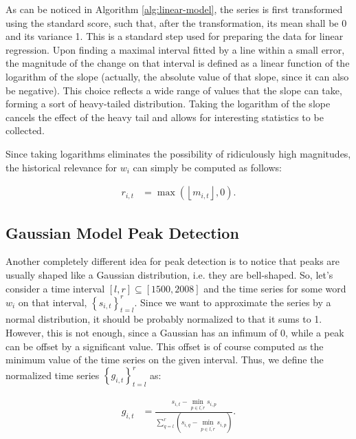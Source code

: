 As can be noticed in Algorithm \autoref{alg:linear-model}, the series is first transformed using the standard score, such that, after the transformation, its mean shall be 0 and its variance 1. This is a standard step used for preparing the data for linear regression. Upon finding a maximal interval fitted by a line within a small error, the magnitude of the change on that interval is defined as a linear function of the logarithm of the slope (actually, the absolute value of that slope, since it can also be negative). This choice reflects a wide range of values that the slope can take, forming a sort of heavy-tailed distribution. Taking the logarithm of the slope cancels the effect of the heavy tail and allows for interesting statistics to be collected.

Since taking logarithms eliminates the possibility of ridiculously high magnitudes, the historical relevance for $w_i$ can simply be computed as follows:

\begin{align}
\label{eq:linear-model-relevance}
r_{i, t} &= \max \left( \left\lfloor m_{i, t} \right\rfloor, 0 \right).
\end{align}

\subsection{Gaussian Model Peak Detection}
\label{subsec:gaussian-model-peak}

Another completely different idea for peak detection is to notice that peaks are usually shaped like a Gaussian distribution, i.e. they are bell-shaped. So, let's consider a time interval $\left[ l, r \right] \subseteq \left[ 1500, 2008 \right]$ and the time series for some word $w_i$ on that interval, $\left\{ s_{i, t} \right\}_{t=l}^{r}$. Since we want to approximate the series by a normal distribution, it should be probably normalized to that it sums to 1. However, this is not enough, since a Gaussian has an infimum of 0, while a peak can be offset by a significant value. This offset is of course computed as the minimum value of the time series on the given interval. Thus, we define the normalized time series $\left\{ g_{i, t} \right\}_{t=l}^{r}$ as:

\begin{align}
\label{eq:gaussian-normalization}
g_{i, t} &= \frac{s_{i, t} - \min_{p \in \overline{l, r}} s_{i, p}}{\sum_{q = l}^{r} \left( s_{i, q} - \min_{p \in \overline{l, r}} s_{i, p} \right)}.
\end{align}

